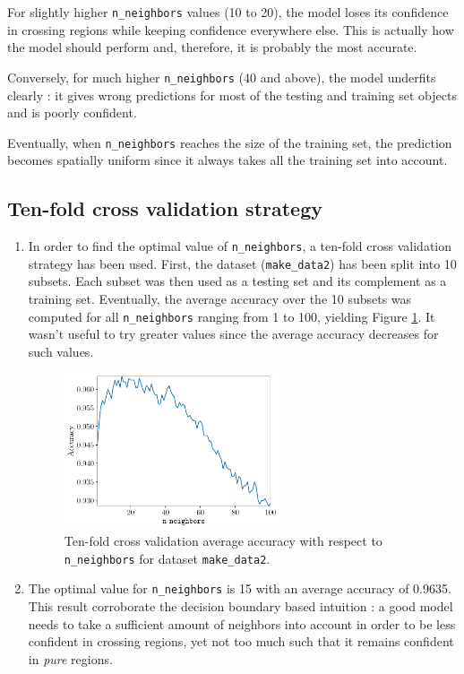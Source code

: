 \documentclass[a4paper, 12pt]{article}
\begin{document}
\begin{enumerate}[label = (\alph*)]
        For slightly higher \texttt{n\_neighbors} values (10 to 20), the model loses its confidence in crossing regions while keeping confidence everywhere else. This is actually how the model should perform and, therefore, it is probably the most accurate.
        
        Conversely, for much higher \texttt{n\_neighbors} (40 and above), the model underfits clearly : it gives wrong predictions for most of the testing and training set objects and is poorly confident.
        
        Eventually, when \texttt{n\_neighbors} reaches the size of the training set, the prediction becomes spatially uniform since it always takes all the training set into account.
    \end{enumerate}
    
    \subsection{Ten-fold cross validation strategy}
    \begin{enumerate}[label = (\alph*)]
        \item In order to find the optimal value of \texttt{n\_neighbors}, a ten-fold cross validation strategy has been used. First, the dataset (\texttt{make\_data2}) has been split into \num{10} subsets. Each subset was then used as a testing set and its complement as a training set. Eventually, the average accuracy over the \num{10} subsets was computed for all \texttt{n\_neighbors} ranging from \num{1} to \num{100}, yielding Figure \ref{fig:ten_fold_average_accuracy}. It wasn't useful to try greater values since the average accuracy decreases for such values.
        
        \begin{figure}[h]
            \centering
            \includegraphics[width=0.6\textwidth]{resources/pdf/make_data2_kfold.pdf}
            \caption{Ten-fold cross validation average accuracy with respect to \texttt{n\_neighbors} for dataset \texttt{make\_data2}.}
            \label{fig:ten_fold_average_accuracy}
        \end{figure}
        
        \item The optimal value for \texttt{n\_neighbors} is 15 with an average accuracy of \num{0.9635}. This result corroborate the decision boundary based intuition : a good model needs to take a sufficient amount of neighbors into account in order to be less confident in crossing regions, yet not too much such that it remains confident in \emph{pure} regions.
    \end{enumerate}
    
\end{document}
